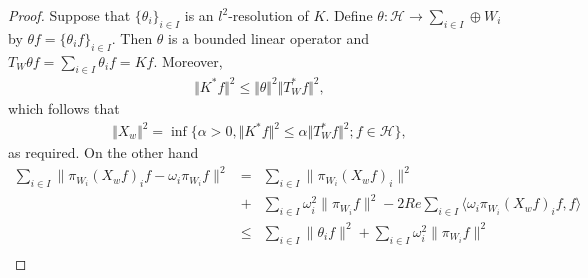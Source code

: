 \documentclass{birkjour}
\theoremstyle{definition}
\theoremstyle{remark}
\numberwithin{equation}{section}
\begin{document}
\begin{proof}
Suppose that $\{\theta_{i}\}_{i\in I}$ is an  $l^{2}$-resolution of $K$. Define  $\theta: \mathcal{H}\rightarrow \sum_{i\in I}\oplus W_{i}$ by $\theta f=\lbrace \theta_{i}f\rbrace_{i\in I}$. Then $\theta$ is a bounded linear operator and $T_{W}\theta f= \sum_{i\in I}\theta_{i}f=Kf$. Moreover,
\begin{eqnarray*}
\Vert K^{*}f\Vert^{2} \leq \Vert \theta\Vert^{2}\Vert T_{W}^{*}f\Vert^{2},
\end{eqnarray*}
which follows that
\begin{eqnarray*}
\Vert X_{w}\Vert ^{2} = \inf \{\alpha>0, \Vert K^{*}f\Vert ^{2}\leq \alpha\Vert T_{W}^{*}f\Vert ^{2}; f\in \mathcal{H}\},
\end{eqnarray*}
as required. On the other hand
\begin{eqnarray*}
\sum_{i\in I}\|\pi_{W_i}(X_{w}f)_{i}f-\omega_{i}\pi_{W_{i}}f\|^2 &=& \sum_{i\in I}\|\pi_{W_i}(X_{w}f)_{i}\|^2\\
&+&\sum_{i\in I}\omega_{i}^{2}\|\pi_{W_{i}}f\|^2 - 2 Re\sum_{i\in I}\langle \omega_{i}\pi_{W_i}(X_{w}f)_{i}f, f\rangle\\
&\leq&  \sum_{i\in
I}\|\theta_{i}f\|^2 + \sum_{i\in I}\omega_{i}^{2}\|\pi_{W_{i}}f\|^2 \\

\end{eqnarray*}
\end{proof}
\end{document}
